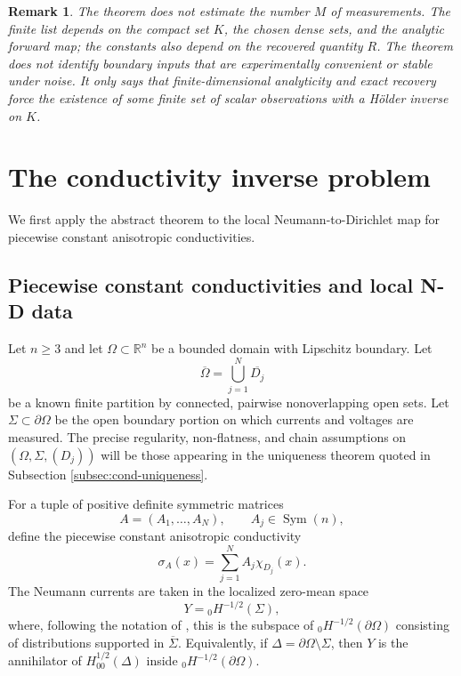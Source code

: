 \documentclass[12pt,oneside]{amsart}
\newtheorem{remark}[theorem]{Remark}
\newcommand{\R}{\mathbb R}
\newcommand{\Sym}{\operatorname{Sym}}
\begin{document}
\begin{remark}\label{rem:finite-nonconstructive}
The theorem does not estimate the number $M$ of measurements.  The finite list depends on the compact set $K$, the chosen dense sets, and the analytic forward map; the constants also depend on the recovered quantity $R$.  The theorem does not identify boundary inputs that are experimentally convenient or stable under noise.  It only says that finite-dimensional analyticity and exact recovery force the existence of some finite set of scalar observations with a H\"older inverse on $K$.
\end{remark}

\section{The conductivity inverse problem}\label{sec:conductivity}

We first apply the abstract theorem to the local Neumann-to-Dirichlet map for piecewise constant anisotropic conductivities.

\subsection{Piecewise constant conductivities and local N-D data}

Let $n\ge3$ and let $\Omega\subset\R^n$ be a bounded domain with Lipschitz boundary.  Let
\[
        \overline\Omega=\bigcup_{j=1}^N\overline{D_j}
\]
be a known finite partition by connected, pairwise nonoverlapping open sets.  Let $\Sigma\subset\partial\Omega$ be the open boundary portion on which currents and voltages are measured.  The precise regularity, non-flatness, and chain assumptions on $(\Omega,\Sigma,(D_j))$ will be those appearing in the uniqueness theorem quoted in Subsection \ref{subsec:cond-uniqueness}.

For a tuple of positive definite symmetric matrices
\[
        A=(A_1,\ldots,A_N),
        \qquad A_j\in\Sym(n),
\]
define the piecewise constant anisotropic conductivity
\[
        \sigma_A(x)=\sum_{j=1}^N A_j\chi_{D_j}(x).
\]
The Neumann currents are taken in the localized zero-mean space
\[
        Y={}_0H^{-1/2}(\Sigma),
\]
where, following the notation of \cite{AlessandriniDeHoopGaburro2017}, this is the subspace of ${}_0H^{-1/2}(\partial\Omega)$ consisting of distributions supported in $\overline\Sigma$.  Equivalently, if $\Delta=\partial\Omega\setminus\Sigma$, then $Y$ is the annihilator of $H^{1/2}_{00}(\Delta)$ inside ${}_0H^{-1/2}(\partial\Omega)$.
\end{document}
